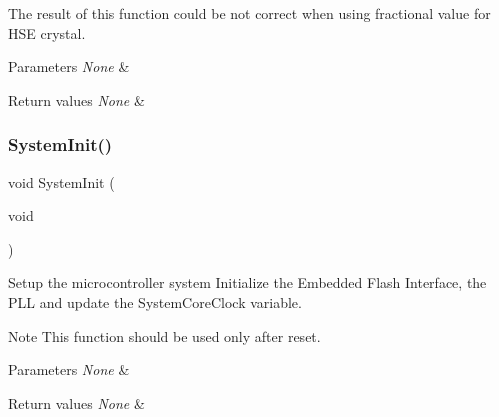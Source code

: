 \begin{DoxyItemize}
\item The result of this function could be not correct when using fractional value for H\+SE crystal. 
\begin{DoxyParams}{Parameters}
{\em None} & \\
\hline
\end{DoxyParams}

\begin{DoxyRetVals}{Return values}
{\em None} & \\
\hline
\end{DoxyRetVals}

\end{DoxyItemize}\mbox{\label{group___s_t_m32_f10x___system___private___functions_ga93f514700ccf00d08dbdcff7f1224eb2}} 
\subsubsection{System\+Init()}
{\footnotesize\ttfamily void System\+Init (\begin{DoxyParamCaption}\item[{void}]{ }\end{DoxyParamCaption})}



Setup the microcontroller system Initialize the Embedded Flash Interface, the P\+LL and update the System\+Core\+Clock variable. 

\begin{DoxyNote}{Note}
This function should be used only after reset. 
\end{DoxyNote}

\begin{DoxyParams}{Parameters}
{\em None} & \\
\hline
\end{DoxyParams}

\begin{DoxyRetVals}{Return values}
{\em None} & \\
\hline
\end{DoxyRetVals}
